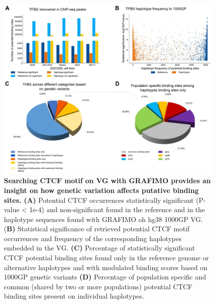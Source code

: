 \documentclass[a4paper, titlepage, openright]{book}
\newcommand{\grafimo}{GRAFIMO\xspace}
\begin{document}
\begin{figure}
	\centering
	\includegraphics[width=\textwidth]{figures/grafimo2.jpg}
	\caption[Searching CTCF motif on VG with \grafimo provides an insight on how genetic variation affects putative
binding sites]{\textbf{Searching CTCF motif on VG with \grafimo provides an insight on how genetic variation affects putative
binding sites. (A)} Potential CTCF occurrences statistically significant (P-value < 1e-4) and non-significant found in the
reference and in the haplotype sequences found with \grafimo oh hg38 1000GP VG. (\textbf{B)} Statistical significance of
retrieved potential CTCF motif occurrences and frequency of the corresponding haplotypes embedded in the VG. \textbf{(C)}
Percentage of statistically significant CTCF potential binding sites found only in the reference genome or alternative
haplotypes and with modulated binding scores based on 1000GP genetic variants \textbf{(D)} Percentage of population specific and
common (shared by two or more populations) potential CTCF binding sites present on individual haplotypes.}
	\label{fig:grafimo2}
\end{figure} 
\end{document}
